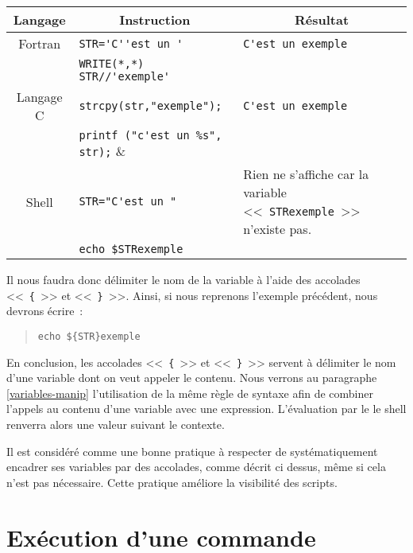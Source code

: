 \begin{tabular}{|c|l|p{5cm}|}
	Langage			& \multicolumn{1}{|c|}{Instruction}
					& \multicolumn{1}{|c|}{R\'{e}sultat}			\\[2ex]
	\hline \hline
	Fortran			& \verb:STR='C''est un ':				&	\verb,C'est un exemple,						\\
					& \verb:WRITE(*,*) STR//'exemple':		&												\\[2ex]
	\hline
	Langage C		& \verb:strcpy(str,"exemple");:			&	\verb,C'est un exemple,						\\
					& \verb:printf ("c'est un %s", str);:	&												\\[2ex]
	\hline
	Shell {\Unix}	& \verb:STR="C'est un ":				&	Rien ne s'affiche car la variable
															    <<~\texttt{STRexemple}~>> n'existe pas.		\\
					& \texttt{echo \$STRexemple}			& \\[2ex]
	\hline
\end{tabular}

Il nous faudra donc d\'{e}limiter le nom de la variable \`{a} l'aide des accolades <<~\verb={=~>> et
<<~\verb=}=~>>. Ainsi, si nous reprenons l'exemple pr\'{e}c\'{e}dent, nous devrons \'{e}crire~:
\begin{quote}
	\texttt{echo \$\{STR\}exemple}
\end{quote}

En conclusion, les accolades <<~\verb={=~>> et <<~\verb=}=~>> servent \`{a} d\'{e}limiter le nom d'une
variable dont on veut appeler le contenu. Nous verrons au paragraphe \ref{variables-manip} l'utilisation de
la m\^{e}me r\`{e}gle de syntaxe afin de combiner l'appels au contenu d'une variable avec une
expression. L'{\'e}valuation par le le shell {\Unix}
renverra alors une valeur suivant le contexte.

\begin{remarque}
Il est consid{\'e}r{\'e} comme une bonne pratique \`{a} respecter de syst{\'e}matiquement encadrer ses 
variables par des accolades, comme d{\'e}crit ci dessus, m{\^e}me si cela n'est pas n{\'e}cessaire.
Cette pratique am{\'e}liore la visibilit{\'e} des scripts.
\end{remarque}

\section{\label{basicnot-exec}Ex{\'e}cution d'une commande}

